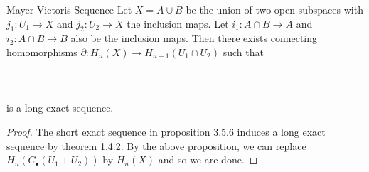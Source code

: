 \documentclass[a4paper]{article}
\begin{document}
\begin{thm}{Mayer-Vietoris Sequence}{} Let $X=A\cup B$ be the union of two open subspaces with $j_1:U_1\to X$ and $j_2:U_2\to X$ the inclusion maps. Let $i_1:A\cap B\to A$ and $i_2:A\cap B\to B$ also be the inclusion maps. Then there exists connecting homomorphisms $\partial:H_n(X)\to H_{n-1}(U_1\cap U_2)$ such that \\~\\
\\~\\
is a long exact sequence. \tcbline
\begin{proof}
The short exact sequence in proposition 3.5.6 induces a long exact sequence by theorem 1.4.2. By the above proposition, we can replace $H_n(C_\bullet(U_1+U_2))$ by $H_n(X)$ and so we are done. 
\end{proof}
\end{thm}
\end{document}
